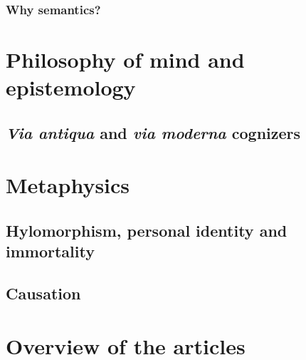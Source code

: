 \documentclass[]{article}
\begin{document}
\subsubsection{Why semantics?}


\section{Philosophy of mind and epistemology}
\subsection{\textit{Via antiqua} and \textit{via moderna} cognizers}
\section{Metaphysics}
\subsection{Hylomorphism, personal identity and immortality}
\subsection{Causation}
\section{Overview of the articles}

\printbibliography
\end{document}
